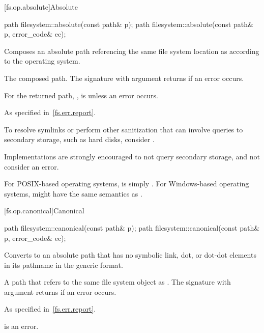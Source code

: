 [fs.op.absolute]{Absolute}

%
\begin{itemdecl}
path filesystem::absolute(const path& p);
path filesystem::absolute(const path& p, error_code& ec);
\end{itemdecl}

\begin{itemdescr}
\pnum
\effects
Composes an absolute path referencing the same file system location
as  according to the operating system.

\pnum
\returns
The composed path.
The signature with argument  returns  if an error occurs.

\pnum
\begin{note}
For the returned path, ,  is 
unless an error occurs.
\end{note}

\pnum
\throws
As specified in~\ref{fs.err.report}.

\pnum
\begin{note}
To resolve symlinks
or perform other sanitization that can involve queries to secondary storage,
such as hard disks, consider .
\end{note}

\pnum
\begin{note}
Implementations are strongly encouraged to not query secondary storage,
and not consider  an error.
\end{note}

\pnum
\begin{example}
For POSIX-based operating systems,
 is simply .
For Windows-based operating systems,
 might have the same semantics as .
\end{example}
\end{itemdescr}

[fs.op.canonical]{Canonical}

%
\begin{itemdecl}
path filesystem::canonical(const path& p);
path filesystem::canonical(const path& p, error_code& ec);
\end{itemdecl}

\begin{itemdescr}
\pnum
\effects
Converts  to an absolute
path that has no symbolic link, dot, or dot-dot elements
in its pathname in the generic format.

\pnum
\returns
A path that refers to
the same file system object as .
The signature with argument  returns  if an error occurs.

\pnum
\throws
As specified in~\ref{fs.err.report}.

\pnum
\remarks
{} is an error.
\end{itemdescr}

